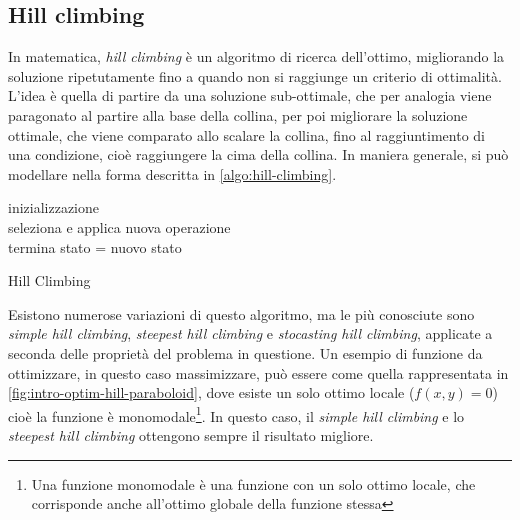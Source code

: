 \subsection{Hill climbing}
\label{chap:intro-optim-hill}
In matematica, \textit{hill climbing} è un algoritmo di ricerca dell'ottimo, migliorando la soluzione ripetutamente fino a quando non si raggiunge un criterio di ottimalità. L'idea è quella di partire da una soluzione sub-ottimale, che per analogia viene paragonato al partire alla base della collina, per poi migliorare la soluzione ottimale, che viene comparato allo scalare la collina, fino al raggiuntimento di una condizione, cioè raggiungere la cima della collina. In maniera generale, si può modellare nella forma descritta in \autoref{algo:hill-climbing}.
\begin{algorithm}[H]
    \SetAlgoLined
    inizializzazione \\
     {
        seleziona e applica nuova operazione \\
         {
            termina
        }
         {
            stato = nuovo stato
        }
    }
    \caption{Hill Climbing}
    \label{algo:hill-climbing}
\end{algorithm}
\vspace{4ex}
Esistono numerose variazioni di questo algoritmo, ma le più conosciute sono \textit{simple hill climbing}, \textit{steepest hill climbing} e \textit{stocasting hill climbing}, applicate a seconda delle proprietà del problema in questione. Un esempio di funzione da ottimizzare, in questo caso massimizzare, può essere come quella rappresentata in \autoref{fig:intro-optim-hill-paraboloid}, dove esiste un solo ottimo locale ($f(x, y) = 0$) cioè la funzione è monomodale\footnote{Una funzione monomodale è una funzione con un solo ottimo locale, che corrisponde anche all'ottimo globale della funzione stessa}. In questo caso, il \textit{simple hill climbing} e lo \textit{steepest hill climbing} ottengono sempre il risultato migliore.

